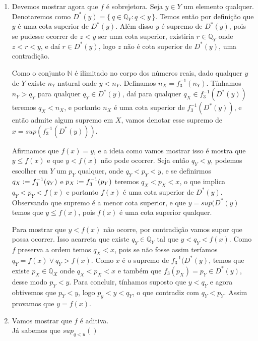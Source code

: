 \documentclass[../main.tex]{subfiles}
\begin{document}
\begin{dem}
\begin{enumerate}
\begin{enumerate}
            \item Devemos mostrar agora que $f$ é sobrejetora. Seja $y \in Y$ um elemento qualquer.
            Denotaremos como $D^*(y) = \{\,q \in \mathbb{Q}_Y : q < y\,\}$. Temos então por definição que $y$ é uma cota superior de $D^*(y)$. Além disso $y$ é supremo de $D^*(y)$, pois se pudesse ocorrer de $z < y$ ser uma cota superior, existiria $r \in \mathbb{Q}_Y$ onde 
            $z < r < y$, e daí $r \in D^*(y)$, logo $z$ não é cota superior de $D^*(y)$, uma contradição.

            Como o conjunto $\mathbb{N}$ é ilimitado no corpo dos números reais, dado qualquer $y$ de $Y$ existe $n_Y$ natural onde $y < n_Y$.
            Definamos $n_X = f_3^{-1}(n_Y)$. Tínhamos $n_Y > q_Y$ para qualquer $q_Y \in D^*(y)$, daí para qualquer $q_X \in f_3^{-1}(D^*(y))$ teremos 
            $q_X < n_X$, e portanto $n_X$ é uma cota superior de $f_3^{-1}(D^*(y))$, e então admite algum supremo em $X$, vamos denotar esse supremo de $x = sup(f_3^{-1}(D^*(y)))$. 

            Afirmamos que $f(x) = y$, e a ideia como vamos mostrar isso é mostra que $y \leq f(x)$ e que $y < f(x)$ não pode ocorrer.
            Seja então $q_Y < y$, podemos escolher em $Y$ um $p_Y$ qualquer, onde $q_Y < p_Y < y$, e se definirmos $q_X \vcentcolon= f_3^{-1}(q_Y)$ e 
            $p_X \vcentcolon= f_3^{-1}(p_Y)$ teremos $q_X < p_X < x$, o que implica $q_Y < p_Y < f(x)$ e portanto $f(x)$ é uma cota superior de $D^*(y)$. Observando que supremo é a menor cota superior, e que $y = sup (D^*(y)$ temos que $y \leq f(x)$, pois $f(x)$ é uma cota superior qualquer.

            Para mostrar que $y < f(x)$ não ocorre, por contradição vamos supor que possa ocorrer. Isso acarreta que existe $q_Y \in \mathbb{Q}_Y$
            tal que $y < q_Y < f(x)$. Como $f$ preserva a ordem temos $q_X < x$, pois se não fosse assim teríamos $q_Y = f(x) \lor q_Y > f(x)$.
            Como $x$ é o supremo de $f_3^{-1}(D^*(y)$, temos que existe $p_X \in \mathbb{Q}_X$ onde $q_X < p_X < x$ e também que $f_3(p_X) = p_Y \in D^*(y)$, desse modo $p_Y < y$. Para concluir, tínhamos suposto que $y < q_Y$ e agora obtivemos que $p_Y < y$, logo $p_y < y < q_Y$, o que contradiz com $q_Y < p_Y$. Assim provamos que $y = f(x)$.

            \item Vamos mostrar que $f$ é aditiva.\\
            Já sabemos que $sup_{q < u}()$
        \end{enumerate}
    
\end{enumerate}
    
\end{dem}
\end{document}
